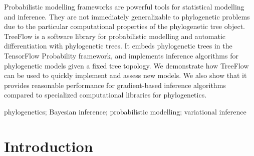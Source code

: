 \usepackage{booktabs}
\usepackage[cachedir=]{minted}
\usepackage{multirow}
\usepackage{setspace}
\usepackage[T1]{fontenc}
\usepackage{standalone}
\usepackage{tikz}
\usepackage{caption}
\usepackage{subcaption}
\usetikzlibrary{fit, positioning, arrows.meta, calc, backgrounds}

\setcounter{secnumdepth}{0}

Probabilistic modelling frameworks are powerful tools for statistical modelling and inference. They are not immediately generalizable to phylogenetic problems due to the particular computational properties of the phylogenetic tree object. TreeFlow is a software library for probabilistic modelling and automatic differentiation with phylogenetic trees. It embeds phylogenetic trees in the TensorFlow Probability framework, and implements inference algorithms for phylogenetic models given a fixed tree topology. We demonstrate how TreeFlow can be used to quickly implement and assess new models. We also show that it provides reasonable performance for gradient-based inference algorithms compared to specialized computational libraries for phylogenetics.

phylogenetics; Bayesian inference; probabilistic modelling; variational inference


\section{Introduction}

